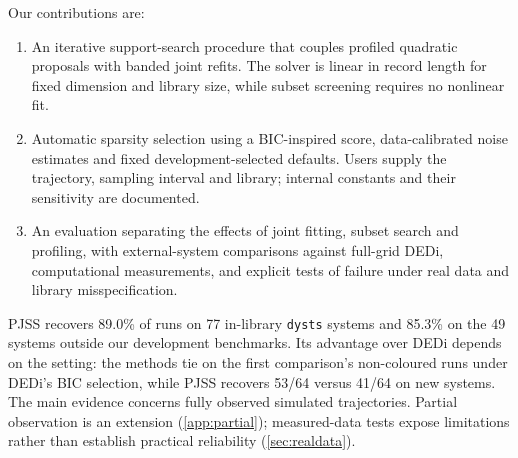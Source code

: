 Our contributions are:
\begin{enumerate}[leftmargin=*,itemsep=2pt]
\item An iterative support-search procedure that couples profiled quadratic proposals with banded joint refits. The solver is linear in record length for fixed dimension and library size, while subset screening requires no nonlinear fit.
\item Automatic sparsity selection using a BIC-inspired score, data-calibrated noise estimates and fixed development-selected defaults. Users supply the trajectory, sampling interval and library; internal constants and their sensitivity are documented.
\item An evaluation separating the effects of joint fitting, subset search and profiling, with external-system comparisons against full-grid DEDi, computational measurements, and explicit tests of failure under real data and library misspecification.
\end{enumerate}

PJSS recovers 89.0\% of runs on 77 in-library \texttt{dysts} systems and 85.3\% on the 49 systems outside our development benchmarks. Its advantage over DEDi depends on the setting: the methods tie on the first comparison's non-coloured runs under DEDi's BIC selection, while PJSS recovers 53/64 versus 41/64 on new systems. The main evidence concerns fully observed simulated trajectories. Partial observation is an extension (\cref{app:partial}); measured-data tests expose limitations rather than establish practical reliability (\cref{sec:realdata}).
